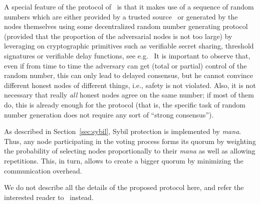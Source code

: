 \documentclass[../main.tex]{subfiles}
\begin{document}
A special feature of the protocol of~\cite{popov2019} is that it makes 
use of a sequence of random numbers which are either
provided by a trusted source~\cite{nist:2019} or generated
by the nodes themselves using some
decentralized random number generating protocol 
(provided that the proportion of the adversarial nodes is not too large) 
by leveraging on cryptographic primitives such as verifiable secret sharing, 
threshold signatures or verifiable delay functions,
see e.g.~\cite{cascudo2017, popov2017, schindler2018, syta2017, boneh:2018}
It is important to observe that,
even if from time to time the adversary can get
(total or partial) control 
of the random number, this can only lead to delayed consensus,
but he cannot convince different honest nodes of different 
things, i.e., safety is not violated.
Also, it is not necessary that really \emph{all}
honest nodes agree on the same number; if most 
of them do, this is already enough for the 
protocol (that is, the specific task
of random number generation does not require
any sort of ``strong consensus'').

As described in Section~\ref{sec:sybil}, Sybil protection is implemented by \emph{mana}.
Thus, any node participating in the voting process forms its quorum by weighting 
the probability of selecting nodes proportionally to their \emph{mana} as well as allowing repetitions. 
This, in turn, allows to create a bigger quorum by minimizing the communication overhead.

We do not describe all the details of the proposed
protocol here, and refer the interested reader to~\cite{popov2019} instead.
\end{document}
